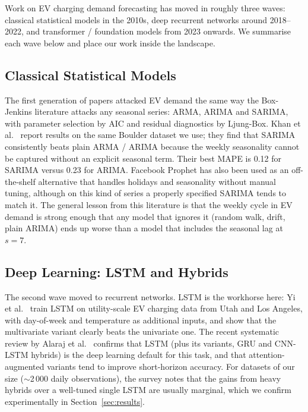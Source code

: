 Work on EV charging demand forecasting has moved in roughly three
waves: classical statistical models in the 2010s, deep recurrent
networks around 2018--2022, and transformer / foundation models from
2023 onwards. We summarise each wave below and place our work inside
the landscape.

\subsection{Classical Statistical Models}

The first generation of papers attacked EV demand the same way the
Box-Jenkins literature attacks any seasonal series: ARMA, ARIMA and
SARIMA, with parameter selection by AIC and residual diagnostics by
Ljung-Box. Khan et al.~\cite{khan2024sarima} report results on the
same Boulder dataset we use; they find that SARIMA consistently beats
plain ARMA / ARIMA because the weekly seasonality cannot be captured
without an explicit seasonal term. Their best MAPE is 0.12 for
SARIMA versus 0.23 for ARIMA. Facebook Prophet has also been used as
an off-the-shelf alternative that handles holidays and seasonality
without manual tuning, although on this kind of series a properly
specified SARIMA tends to match it. The general lesson from this
literature is that the weekly cycle in EV demand is strong enough
that any model that ignores it (random walk, drift, plain ARIMA) ends
up worse than a model that includes the seasonal lag at $s = 7$.

\subsection{Deep Learning: LSTM and Hybrids}

The second wave moved to recurrent networks. LSTM is the workhorse
here: Yi et al.~\cite{yi2022lstm} train LSTM on utility-scale EV
charging data from Utah and Los Angeles, with day-of-week and
temperature as additional inputs, and show that the multivariate
variant clearly beats the univariate one. The recent systematic
review by Alaraj et al.~\cite{alaraj2025survey} confirms that LSTM
(plus its variants, GRU and CNN-LSTM hybrids) is the deep learning
default for this task, and that attention-augmented variants tend to
improve short-horizon accuracy. For datasets of our size
($\sim$2\,000 daily observations), the survey notes that the gains
from heavy hybrids over a well-tuned single LSTM are usually marginal,
which we confirm experimentally in Section~\ref{sec:results}.

